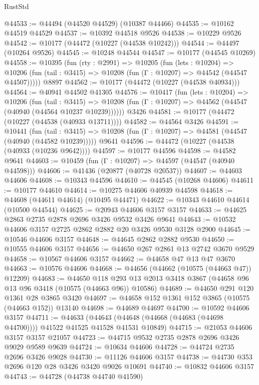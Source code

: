 \begin{lexlean}{RustStd}
\begin{coremodule}
@44533 := @44494 (@44520 @44529) (@10387 @44466)
@44535 := @10162 @44519 @44529
@44537 := @10392 @44518 @9526
@44538 := @10229 @9526
@44542 := @10177 (@44472 (@10227 (@44538 @10242)))
@44544 := @44497 (@10264 @9526)
@44545 := @10248 @44544
@44547 := @10177 (@44545 @10269)
@44558 := @10395
    (fun (rty : @2991) =>
    @10205
      (fun (lets : @10204) =>
      @10206 (fun (tail : @3415) => @10208 (fun (Γ : @10207) => @44542 (@44547 @44507)))))
    @8897
@44562 := @10177 (@44472 (@10227 (@44538 @40934)))
@44564 := @40941 @44502 @41305
@44576 := @10417
    (fun (lets : @10204) =>
    @10206
      (fun (tail : @3415) =>
      @10208 (fun (Γ : @10207) => @44562 (@44547 (@40940 (@44564 @10237 @10239))))))
    @3426
@44581 := @10177 (@44472 (@10227 (@44538 (@40933 @13711))))
@44582 := @44564 @3426
@44591 := @10441
    (fun (tail : @3415) => @10208 (fun (Γ : @10207) => @44581 (@44547 (@40940 (@44582 @10239)))))
    @9641
@44596 := @44472 (@10227 (@44538 (@40933 (@10236 @9642))))
@44597 := @10177 @44596
@44598 := @44582 @9641
@44603 := @10459 (fun (Γ : @10207) => @44597 (@44547 (@40940 @44598)))
@44606 := @41436 (@20877 (@40728 @20537))
@44607 := @44603 @44606
@44608 := @10343 @44596
@44610 := @44545 (@10268 @44606)
@44611 := @10177 @44610
@44614 := @10275 @44606 @40939 @44598
@44618 := @44608 (@44611 @44614) (@10495 @44471)
@44622 := @10343 @44610 @44614 (@10500 @44544)
@44625 := @20943 @44606 @3157 @3157
@44633 := @44625 @2863 @2735 @2878 @2696 @3426 @9532 @3426 @9641
@44643 := @10532 @44606 @3157 @2725 @2862 @2882 @20 @3426 @9530 @3128 @2900
@44645 := @10546 @44606 @3157
@44648 := @44645 @2862 @2882 @9530
@44650 := @10555 @44606 @3157
@44656 := @44650 @267 @2861 @13 @2742 @3670 @9529
@44658 := @10567 @44606 @3157
@44662 := @44658 @47 @13 @47 @3670
@44663 := @10576 @44606
@44668 := @44656 (@44662 (@10575 (@44663 @47)) @12209)
@44683 := @44650
    @118
    @293
    @13
    @2013
    @3418
    @3867
    (@44658 @96 @13 @96 @3418 (@10575 (@44663 @96)) @10586)
@44689 := @44650 @291 @120 @1361 @28 @3865 @3420
@44697 := @44658 @152 @1361 @152 @3865 (@10575 (@44663 @152)) @13140
@44698 := @44689 @44697
@44700 := @10592 @44606 @3157
@44711 := @44633
    (@44643 (@44648 (@44668 (@44683 (@44698 @44700)))) @41522 @41525 @41528 @41531 @10849)
@44715 := @21053 @44606 @3157 @3157 @21057
@44723 := @44715 @9532 @2735 @2878 @2696 @3426 @9029 @9589 @9639
@44724 := @10634 @44606
@44728 := @44724 @2735 @2696 @3426 @9028
@44730 := @11126 @44606 @3157
@44738 := @44730 @353 @2696 @120 @28 @3426 @3420 @9026 @10691
@44740 := @10832 @44606 @3157
@44743 := @44728 (@44738 @44740 @41590)

\end{coremodule}
\end{lexlean}
